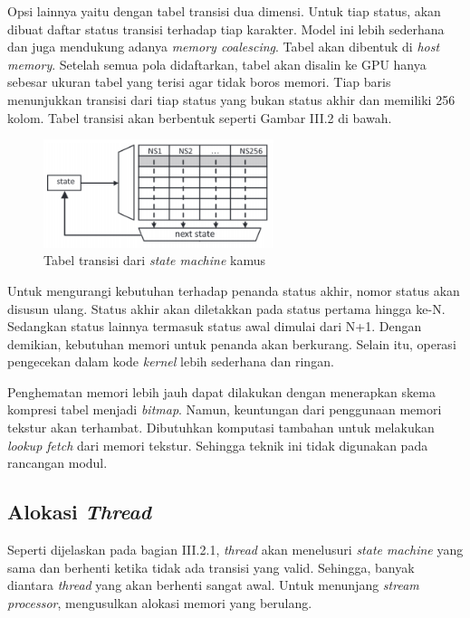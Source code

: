       Opsi lainnya yaitu dengan tabel transisi dua dimensi. Untuk tiap status, akan dibuat daftar status transisi terhadap tiap karakter. Model ini lebih sederhana dan juga mendukung adanya \emph{memory coalescing}. Tabel akan dibentuk di \emph{host memory}. Setelah semua pola didaftarkan, tabel akan disalin ke GPU hanya sebesar ukuran tabel yang terisi agar tidak boros memori. Tiap baris menunjukkan transisi dari tiap status yang bukan status akhir dan memiliki 256 kolom. Tabel transisi akan berbentuk seperti Gambar III.2 di bawah.

      \begin{figure}[htb]
        \centering
        \includegraphics[width=0.6\textwidth]{resources/table.png}
        \caption[Tabel transisi]{Tabel transisi dari \emph{state machine} kamus}
      \end{figure}

      Untuk mengurangi kebutuhan terhadap penanda status akhir, nomor status akan disusun ulang. Status akhir akan diletakkan pada status pertama hingga ke-N. Sedangkan status lainnya termasuk status awal dimulai dari N+1. Dengan demikian, kebutuhan memori untuk penanda akan berkurang. Selain itu, operasi pengecekan dalam kode \emph{kernel} lebih sederhana dan ringan.

      Penghematan memori lebih jauh dapat dilakukan dengan menerapkan skema kompresi tabel menjadi \emph{bitmap}. Namun, keuntungan dari penggunaan memori tekstur akan terhambat. Dibutuhkan komputasi tambahan untuk melakukan \emph{lookup fetch} dari memori tekstur. Sehingga teknik ini tidak digunakan pada rancangan modul.

      \subsection{Alokasi \emph{Thread}}

      Seperti dijelaskan pada bagian III.2.1, \emph{thread} akan menelusuri \emph{state machine} yang sama dan berhenti ketika tidak ada transisi yang valid. Sehingga, banyak diantara \emph{thread} yang akan berhenti sangat awal. Untuk menunjang \emph{stream processor}, \cite{lin2013} mengusulkan alokasi memori yang berulang.

